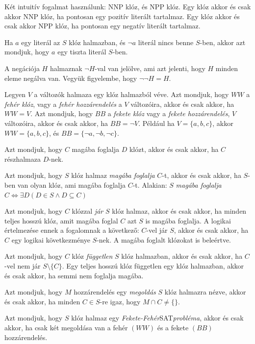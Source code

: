 \documentclass[
]{thesis-ekf}
\theoremstyle{definition}
\theoremstyle{remark}
\begin{document}
	Két intuitív fogalmat használunk: \textsc{NNP} klóz, és \textsc{NPP} klóz. Egy klóz akkor és csak akkor \textsc{NNP} klóz, ha pontosan egy pozitív literált tartalmaz. Egy klóz akkor és csak akkor \textsc{NPP} klóz, ha pontosan egy negatív literált tartalmaz.
	
	Ha $ a $ egy literál az $ S $ klóz halmazban, és $ \neg a $ literál nincs benne $ S $-ben, akkor azt mondjuk, hogy $ a $ egy tiszta literál $ S $-ben.
	
	A negációja $ H $ halmaznak $ \neg H $-val van jelölve, ami azt jelenti, hogy $ H $ minden eleme negálva van. Vegyük figyelembe, hogy $ \neg\neg H=H $.

	Legyen $ V $ a változók halmaza egy klóz halmazból véve. Azt mondjuk, hogy $ WW $ a \emph{fehér klóz}, vagy a \emph{fehér hozzárendelés} a $ V $ változóira, akkor és csak akkor, ha $ WW=V $. Azt mondjuk, hogy $ BB $ a \emph{fekete klóz} vagy a \emph{fekete hozzárendelés}, $ V $ változóira, akkor és csak akkor, ha $ BB =\neg V$. Például ha $ V=\{a,b,c\} $, akkor $ WW=\{a,b,c\} $, és $ BB=\{\neg a,\neg b,\neg c\} $.
	
	Azt mondjuk, hogy $ C $ magába foglalja $ D $ klózt, akkor és csak akkor, ha $ C $ részhalmaza $ D $-nek.
	
	Azt mondjuk, hogy $ S $ klóz halmaz \emph{magába foglalja} $ C $-t, akkor és csak akkor, ha $ S $-ben van olyan klóz, ami magába foglalja $ C $-t. Alakian: $ S $ \emph{magába foglalja} $ C \Leftrightarrow\exists D(D\in S\wedge D\subseteq C) $
	
	Azt mondjuk, hogy $ C $ klózzal \emph{jár} $ S $ klóz halmaz, akkor és csak akkor, ha minden teljes hosszú klóz, amit magába foglal $ C $ azt $ S $ is magába foglalja. A logikai értelmezése ennek a fogalomnak a következő: $ C $-vel jár $ S $, akkor és csak akkor, ha $ C $ egy logikai következménye $ S $-nek. A magába foglalt klózokat is beleértve.

	Azt mondjuk, hogy $ C $ klóz \emph{független} $ S $ klóz halmazban, akkor és csak akkor, ha $ C $-vel nem jár $ S\setminus\{C\} $. Egy teljes hosszú klóz független egy klóz halmazban, akkor és csak akkor, ha semmi nem foglalja magába.

	Azt mondjuk, hogy $ M $ hozzárendelés egy \emph{megoldás} $ S $ klóz halmazra nézve, akkor és csak akkor, ha minden $ C\in S $-re igaz, hogy $ M\cap C\ne \{\} $.

	Azt mondjuk, hogy $ S $ klóz halmaz egy \emph{Fekete-Fehér}\textsc{SAT}\emph{probléma}, akkor és csak akkor, ha csak két megoldása van a fehér $ (WW) $ és a fekete $ (BB) $ hozzárendelés.
\end{document}
